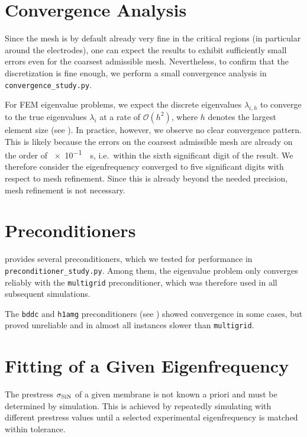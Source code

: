 \section{Convergence Analysis}
\label{sec:convergence_analysis}

Since the mesh is by default already very fine in the critical regions (in particular around the electrodes), one can expect the results to exhibit sufficiently small errors even for the coarsest admissible mesh. Nevertheless, to confirm that the discretization is fine enough, we perform a small convergence analysis in \texttt{convergence\_study.py}.  

For FEM eigenvalue problems, we expect the discrete eigenvalues $\lambda_{i,h}$ to converge to the true eigenvalues $\lambda_i$ at a rate of $\mathcal{O}(h^2)$, where $h$ denotes the largest element size (see \cite{Faustmann+Melenk24}). In practice, however, we observe no clear convergence pattern. This is likely because the errors on the coarsest admissible mesh are already on the order of \SI{e-1}{\per\second}, i.e.\ within the sixth significant digit of the result. We therefore consider the eigenfrequency converged to five significant digits with respect to mesh refinement. Since this is already beyond the needed precision, mesh refinement is not necessary.\\

\section{Preconditioners}

\ngsolve provides several preconditioners, which we tested for performance in \texttt{preconditioner\_study.py}. Among them, the eigenvalue problem only converges reliably with the \texttt{multigrid} preconditioner, which was therefore used in all subsequent simulations.  

The \texttt{bddc} and \texttt{h1amg} preconditioners (see \cite{NGSolvePreconditioner}) showed convergence in some cases, but proved unreliable and in almost all instances slower than \texttt{multigrid}.\\

\section{Fitting of a Given Eigenfrequency}

The prestress $\sigma_{\mathrm{SiN}}$ of a given membrane is not known a priori and must be determined by simulation. This is achieved by repeatedly simulating with different prestress values until a selected experimental eigenfrequency is matched within tolerance.  

